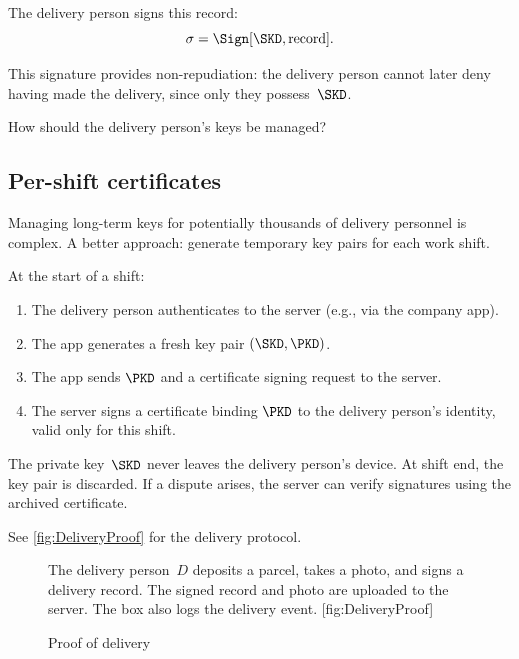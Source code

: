 The delivery person signs this record:
\[
  \sigma = \Sign[\SKD, \text{record}].
\]

This signature provides non-repudiation: the delivery person cannot later
deny having made the delivery, since only they possess~\(\SKD\).

\begin{exercise}
  How should the delivery person's keys be managed?
\end{exercise}

\subsection{Per-shift certificates}

Managing long-term keys for potentially thousands of delivery personnel is
complex.
A better approach: generate temporary key pairs for each work shift.

At the start of a shift:
\begin{enumerate}
  \item The delivery person authenticates to the server (e.g., via the
    company app).
  \item The app generates a fresh key pair \((\SKD, \PKD)\).
  \item The app sends \(\PKD\) and a certificate signing request to the
    server.
  \item The server signs a certificate binding \(\PKD\) to the delivery
    person's identity, valid only for this shift.
\end{enumerate}

The private key~\(\SKD\) never leaves the delivery person's device.
At shift end, the key pair is discarded.
If a dispute arises, the server can verify signatures using the archived
certificate.

See \cref{fig:DeliveryProof} for the delivery protocol.

\begin{figure}
  \begin{sidecaption}{%
    The delivery person~\(D\) deposits a parcel, takes a photo, and signs
    a delivery record.
    The signed record and photo are uploaded to the server.
    The box also logs the delivery event.
  }[fig:DeliveryProof]
  \flushright
  \begin{msc}
    [/msc/action width=0.35\linewidth]
    {Proof of delivery}
      \nextlevel[3]
      \nextlevel
      \nextlevel
      \nextlevel
      \nextlevel[2]
      \nextlevel
      \nextlevel
  \end{msc}
  \end{sidecaption}
\end{figure}

